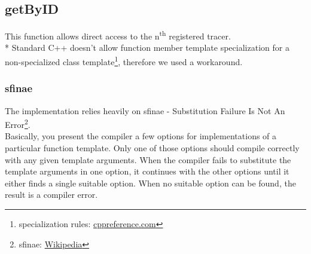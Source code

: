 \documentclass[12pt]{article}
\begin{document}
\subsection{getByID}
This function allows direct access to the n\textsuperscript{th} registered tracer.\\*
Standard C++ doesn't allow function member template specialization for a non-specialized class template\footnote{specialization rules: \href{http://en.cppreference.com/w/cpp/language/template_specialization}{cppreference.com}}, therefore we used a workaround.
\subsubsection{sfinae}
The implementation relies heavily on sfinae - Substitution Failure Is Not An Error\footnote{sfinae: \href{http://en.wikipedia.org/wiki/Substitution_failure_is_not_an_error}{Wikipedia}}.\\
Basically, you present the compiler a few options for implementations of a particular function template. Only one of those options should compile correctly with any given template arguments. When the compiler fails to substitute the template arguments in one option, it continues with the other options until it either finds a single suitable option. When no suitable option can be found, the result is a compiler error.\\
\end{document}
